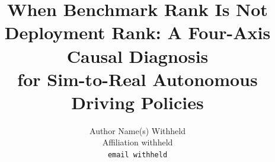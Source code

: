 \documentclass[10pt,twocolumn,letterpaper]{article}
\title{When Benchmark Rank Is Not Deployment Rank: A Four-Axis Causal Diagnosis\\
for Sim-to-Real Autonomous Driving Policies}
\author{Author Name(s) Withheld\\
Affiliation withheld\\
{\tt\small email withheld}
}
\begin{document}
\maketitle






{
    \small
    
    
}
\end{document}
